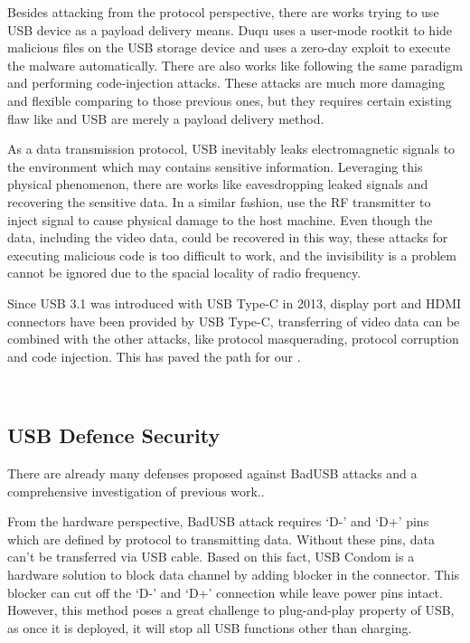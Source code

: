 Besides attacking from the protocol perspective, there are works trying to use USB device as a payload delivery means. Duqu\cite{duqu} uses a user-mode rootkit to hide malicious files on the USB storage device and uses a zero-day exploit\cite{zero-day} to execute the malware automatically. There are also works like \cite{brain, stuxnet, conficker,flame} following the same paradigm and performing code-injection attacks. These attacks are much more damaging and flexible comparing to those previous ones, but they requires certain existing flaw like \cite{zero-day} and USB are merely a payload delivery method.

As a data transmission protocol, USB inevitably leaks electromagnetic signals to the environment which may contains sensitive information. Leveraging this physical phenomenon, there are works like \cite{smartphone, poweremi,revealing,su2017usb, usbgpslocator, bates2014leveraging, badusbhub, usbfinger, side, usbdriver} eavesdropping leaked signals and recovering the sensitive data. In a similar fashion, \cite{usbkiller, cable, usbee, turnip} use the RF transmitter to inject signal to cause physical damage to the host machine. Even though the data, including the video data, could be recovered in this way, these attacks for executing malicious code is too difficult to work, and the invisibility is a problem cannot be ignored due to the spacial locality of radio frequency. 

Since USB 3.1 was introduced with USB Type-C in 2013, display port and HDMI connectors have been provided by USB Type-C, transferring of video data can be combined with the other attacks, like protocol masquerading,  protocol corruption and code injection. This has paved the path for our \tool.




\\


\subsection{USB Defence Security}
\label{subsec:usb_defence}
There are already many defenses proposed against BadUSB attacks and a comprehensive investigation of previous work.\cite{sok}.

From the hardware perspective, BadUSB attack requires `D-' and `D+' pins which are defined by protocol to transmitting data.
Without these pins, data can't be transferred via USB cable. Based on this fact, USB Condom \cite{Condom} is a hardware solution to block data channel by adding blocker in the connector. This blocker can cut off the `D-' and `D+' connection while leave power pins intact.
However, this method poses a great challenge to plug-and-play property of USB, as once it is deployed, it will stop all USB functions other than charging. 

